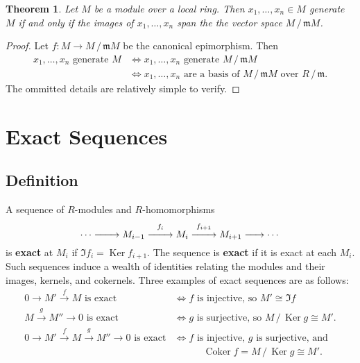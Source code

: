 \documentclass[11pt]{article}
\newtheorem{theorem}{Theorem}
\newcommand{\Ker}{\operatorname{Ker}}
\newcommand{\Coker}{\operatorname{Coker}}
\renewcommand{\longrightarrow}{\xrightarrow{\hspace*{0.7cm}}}
\begin{document}
\begin{adjustwidth}{0.5cm}{}
	\begin{theorem}
		Let $M$ be a module over a local ring. Then $x_{1}, \ldots, x_{n} \in M$ generate $M$ if and only if the images of $x_{1}, \ldots, x_{n}$ span the the vector space $M \,/\, \mathfrak{m} M$.
	\end{theorem}
	\begin{proof}
		Let $f : M \to M \,/\, \mathfrak{m} M$ be the canonical epimorphism. Then
		\begin{align*}
			\text{$x_{1}, \ldots, x_{n}$ generate $M$} &\iff \text{$x_{1}, \ldots, x_{n}$ generate $M \,/\, \mathfrak{m} M$} \\
			&\iff \text{$x_{1}, \ldots, x_{n}$ are a basis of $M \,/\, \mathfrak{m} M$ over $R \,/\, \mathfrak{m}$}.
		\end{align*}
		The ommitted details are relatively simple to verify.
	\end{proof}
\end{adjustwidth}


\newpage


\section{Exact Sequences}


\subsection{Definition}

A sequence of $R$-modules and $R$-homomorphisms
\begin{equation}
	\cdots \longrightarrow M_{i - 1} \stackrel{f_{i}}{\longrightarrow} M_{i} \stackrel{f_{i + 1}}{\longrightarrow} M_{i + 1} \xrightarrow{\hspace*{0.5cm}} \cdots 
\end{equation}
is \textbf{exact} at $M_{i}$ if $\Im f_{i} = \Ker f_{i + 1}$. The sequence is \textbf{exact} if it is exact at each $M_{i}$. Such sequences induce a wealth of identities relating the modules and their images, kernels, and cokernels. Three examples of exact sequences are as follows:
\begin{align*}
	0 \to M' \stackrel{f}{\to} M \text{ is exact } &\iff \text{$f$ is injective, so $M' \cong \Im f$} \\
	M \stackrel{g}{\to} M'' \to 0 \text{ is exact } &\iff \text{$g$ is surjective, so $M \,/\, \Ker g \cong M'$.} \\
	0 \to M' \stackrel{f}{\to} M \stackrel{g}{\to} M'' \to 0 \text{ is exact} &\iff \text{$f$ is injective, $g$ is surjective, and} \\
	& \quad \qquad \text{$\Coker f = M \,/\, \Ker g \cong M'$}.
\end{align*}
\end{document}
